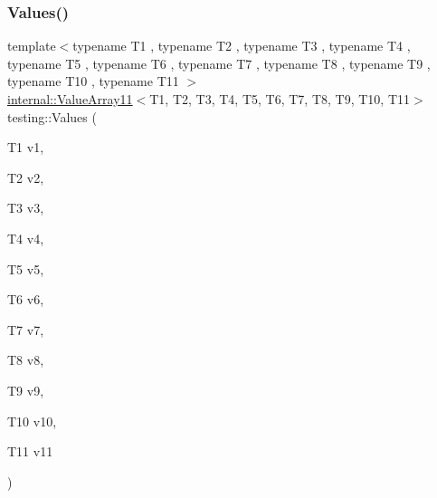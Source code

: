 \mbox{\label{namespacetesting_a4aaae77b8404038ed5f3bf56cccdb940}} 
\subsubsection{\texorpdfstring{Values()}{Values()}\hspace{0.1cm}{\footnotesize\ttfamily [12/51]}}
{\footnotesize\ttfamily template$<$typename T1 , typename T2 , typename T3 , typename T4 , typename T5 , typename T6 , typename T7 , typename T8 , typename T9 , typename T10 , typename T11 $>$ \\
\mbox{\hyperlink{classtesting_1_1internal_1_1_value_array11}{internal\+::\+Value\+Array11}}$<$T1, T2, T3, T4, T5, T6, T7, T8, T9, T10, T11$>$ testing\+::\+Values (\begin{DoxyParamCaption}\item[{T1}]{v1,  }\item[{T2}]{v2,  }\item[{T3}]{v3,  }\item[{T4}]{v4,  }\item[{T5}]{v5,  }\item[{T6}]{v6,  }\item[{T7}]{v7,  }\item[{T8}]{v8,  }\item[{T9}]{v9,  }\item[{T10}]{v10,  }\item[{T11}]{v11 }\end{DoxyParamCaption})}

\mbox{\label{namespacetesting_a03e7f9611794732bb030c53365dc6c86}} 
